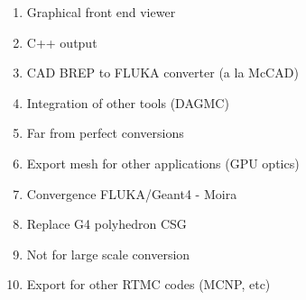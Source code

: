 \documentclass[final,5p,times,twocolumn]{elsarticle}
\begin{document}
\begin{enumerate}
\item Graphical front end viewer
\item C++ output
\item CAD BREP to FLUKA converter (a la McCAD) 
\item Integration of other tools (DAGMC) 
\item Far from perfect conversions
\item Export mesh for other applications (GPU optics)
\item Convergence FLUKA/Geant4 - Moira 
\item Replace G4 polyhedron CSG
\item Not for large scale conversion
\item Export for other RTMC codes (MCNP, etc) 
\end{enumerate}












\end{document}
